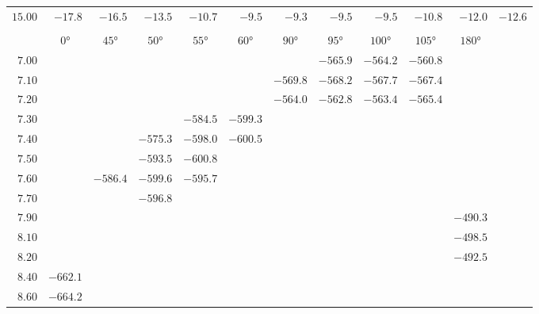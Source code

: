 \documentclass[11pt, a4paper, openany]{report}
\begin{document}
\begin{table}[H]
\begin{center}
{\begin{tabular}[c]{rrrrrrrrrrrr}
      $15.00$ & $-17.8$ & $-16.5$ & $-13.5$ & $-10.7$ & $-9.5$ & $-9.3$ & $-9.5$ & $-9.5$ & $-10.8$ & $-12.0$ & $-12.6$ \\
      \\
      \multicolumn{1}{c}{} & 
      \multicolumn{1}{c}{$0$°} &
      \multicolumn{1}{c}{$45$°} &
      \multicolumn{1}{c}{$50$°} &
      \multicolumn{1}{c}{$55$°} &
      \multicolumn{1}{c}{$60$°} &
      \multicolumn{1}{c}{$90$°} &
      \multicolumn{1}{c}{$95$°} &
      \multicolumn{1}{c}{$100$°} &
      \multicolumn{1}{c}{$105$°} &
      \multicolumn{1}{c}{$180$°} &
      \multicolumn{1}{c}{} \\        
      \hline
      $7.00$ & & & & & & & $-565.9$ & $-564.2$ & $-560.8$ & & \\
      $7.10$ & & & & & & $-569.8$ & $-568.2$ & $-567.7$ & $-567.4$ & & \\
      $7.20$ & & & & & & $-564.0$ & $-562.8$ & $-563.4$ & $-565.4$ & & \\
      $7.30$ & & & & $-584.5$ & $-599.3$ & & & & & & \\
      $7.40$ & & & $-575.3$ & $-598.0$ & $-600.5$ & & & & & & \\
      $7.50$ & & & $-593.5$ & $-600.8$ & & & & & & & \\
      $7.60$ & & $-586.4$ & $-599.6$ & $-595.7$ & & & & & & & \\
      $7.70$ & & & $-596.8$ & & & & & & & & \\
      $7.90$ & & & & & & & & & & $-490.3$ & \\
      $8.10$ & & & & & & & & & & $-498.5$ & \\
      $8.20$ & & & & & & & & & & $-492.5$ & \\
      $8.40$ & $-662.1$ & & & & & & & & & & \\
      $8.60$ & $-664.2$ & & & & & & & & & & \\ 
      \hline
      \hline
    \end{tabular}
  }
  \end{center}
\end{table}
\end{document}
